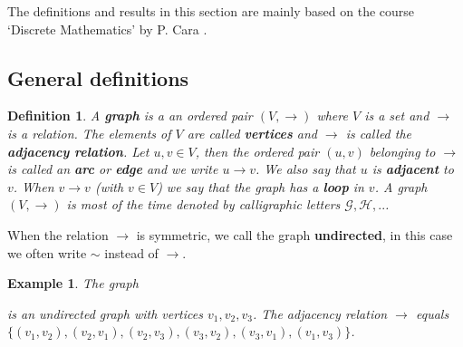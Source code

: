 \documentclass[a4paper,11pt]{report}
\newtheorem{example}[theorem]{Example}
\newtheorem{definition}[theorem]{Definition}
\begin{document}
The definitions and results in this section are mainly based on the course 
`Discrete Mathematics' by P. Cara \cite{cara}. 


\subsection{General definitions}
\begin{definition}\label{defgraf}
  A \textbf{graph} is a an ordered pair $(V,\rightarrow)$ where $V$ is a set and $\to$ is a relation. The elements of $V$ are called
 \textbf{vertices} and $\rightarrow$ is called the \textbf{adjacency relation}. Let $u, v \in V$, then the ordered pair 
 $(u, v)$ belonging to $\to$ is called an \textbf{arc} or \textbf{edge} and we write $u \rightarrow v$. We also
 say that $u$ is \textbf{adjacent} to $v$.  When $v \to v$ (with $v \in V$) we say that the graph has a 
 \textbf{loop} in $v$. A graph $(V,\rightarrow)$ is 
  most of the time denoted by calligraphic letters $\mathscr{G}, 
  \mathscr{H},..$.   \end{definition}
 When the relation $\rightarrow$ is symmetric, 
 we call the graph \textbf{undirected}, in this case we often write $\sim$ instead 
 of $\rightarrow$.  
 
 
 \begin{example}\label{simpelegraf}
  The graph
  \begin{center}

\end{center}
is an undirected graph with vertices $v_1, v_2, v_3$. The adjacency 
relation $\to$ equals \\$\{(v_1,v_2), (v_2,v_1), (v_2, v_3), (v_3,v_2), (v_3, v_1), 
(v_1,v_3)\}$.
\end{example}
\end{document}
